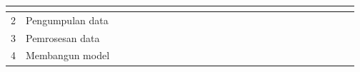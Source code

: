 \begin{table}[H]
{\begin{tabular}{|l|l|llllllllllllllllllllllll|}
    \multicolumn{1}{l|}{} &
    \multicolumn{1}{l|}{} &
    \multicolumn{1}{l|}{} &
    \multicolumn{1}{l|}{} &
    \multicolumn{1}{l|}{} &
    \multicolumn{1}{l|}{} &
    \multicolumn{1}{l|}{} &
    \multicolumn{1}{l|}{} &
    \multicolumn{1}{l|}{} &
     \\ \hline
  2 &
    Pengumpulan data &
    \multicolumn{1}{l|}{} &
    \multicolumn{1}{l|}{} &
    \multicolumn{1}{l|}{\cellcolor[HTML]{333333}} &
    \multicolumn{1}{l|}{\cellcolor[HTML]{333333}} &
    \multicolumn{1}{l|}{\cellcolor[HTML]{333333}} &
    \multicolumn{1}{l|}{\cellcolor[HTML]{333333}} &
    \multicolumn{1}{l|}{} &
    \multicolumn{1}{l|}{} &
    \multicolumn{1}{l|}{} &
    \multicolumn{1}{l|}{} &
    \multicolumn{1}{l|}{} &
    \multicolumn{1}{l|}{} &
    \multicolumn{1}{l|}{} &
    \multicolumn{1}{l|}{} &
    \multicolumn{1}{l|}{} &
    \multicolumn{1}{l|}{} &
    \multicolumn{1}{l|}{} &
    \multicolumn{1}{l|}{} &
    \multicolumn{1}{l|}{} &
    \multicolumn{1}{l|}{} &
    \multicolumn{1}{l|}{} &
    \multicolumn{1}{l|}{} &
    \multicolumn{1}{l|}{} &
     \\ \hline
  3 &
    Pemrosesan data &
    \multicolumn{1}{l|}{} &
    \multicolumn{1}{l|}{} &
    \multicolumn{1}{l|}{} &
    \multicolumn{1}{l|}{} &
    \multicolumn{1}{l|}{\cellcolor[HTML]{333333}} &
    \multicolumn{1}{l|}{\cellcolor[HTML]{333333}} &
    \multicolumn{1}{l|}{\cellcolor[HTML]{333333}} &
    \multicolumn{1}{l|}{\cellcolor[HTML]{333333}} &
    \multicolumn{1}{l|}{\cellcolor[HTML]{333333}} &
    \multicolumn{1}{l|}{\cellcolor[HTML]{333333}} &
    \multicolumn{1}{l|}{} &
    \multicolumn{1}{l|}{} &
    \multicolumn{1}{l|}{} &
    \multicolumn{1}{l|}{} &
    \multicolumn{1}{l|}{} &
    \multicolumn{1}{l|}{} &
    \multicolumn{1}{l|}{} &
    \multicolumn{1}{l|}{} &
    \multicolumn{1}{l|}{} &
    \multicolumn{1}{l|}{} &
    \multicolumn{1}{l|}{} &
    \multicolumn{1}{l|}{} &
    \multicolumn{1}{l|}{} &
     \\ \hline
  4 &
    Membangun model &
    \multicolumn{1}{l|}{} &
    \multicolumn{1}{l|}{} &
    \multicolumn{1}{l|}{} &
    \multicolumn{1}{l|}{} &
    \multicolumn{1}{l|}{} &
    \multicolumn{1}{l|}{} &
    \multicolumn{1}{l|}{} &
    \multicolumn{1}{l|}{} &
    \multicolumn{1}{l|}{} &
    \multicolumn{1}{l|}{} &
    \multicolumn{1}{l|}{\cellcolor[HTML]{333333}} &
    \multicolumn{1}{l|}{\cellcolor[HTML]{333333}} &
    \multicolumn{1}{l|}{} &
    \multicolumn{1}{l|}{} &
    \multicolumn{1}{l|}{} &
    \multicolumn{1}{l|}{} &
    \multicolumn{1}{l|}{} &
    \multicolumn{1}{l|}{} &
    \multicolumn{1}{l|}{} &

\end{tabular}}
\end{table}
